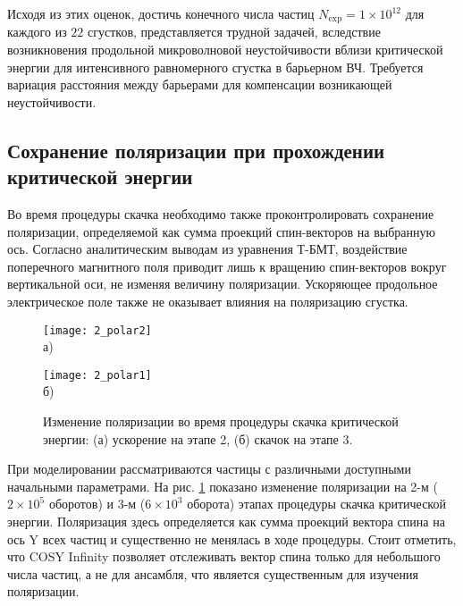 \par Исходя из этих оценок, достичь конечного числа частиц $N_{\textrm{exp}}=1\times10^{12}$ для каждого из $22$ сгустков, представляется трудной задачей, вследствие возникновения продольной микроволновой неустойчивости вблизи критической энергии для интенсивного равномерного сгустка в барьерном ВЧ. Требуется вариация расстояния между барьерами для компенсации возникающей	неустойчивости.

	\subsection{Сохранение поляризации при прохождении критической энергии}\label{subsec:transition_jump/regular/polarization}

\par Во время процедуры скачка необходимо также проконтролировать сохранение поляризации, определяемой как сумма проекций спин-векторов на выбранную ось. Согласно аналитическим выводам из уравнения Т-БМТ, воздействие поперечного магнитного поля приводит лишь к вращению спин-векторов вокруг вертикальной оси, не изменяя величину поляризации. Ускоряющее продольное электрическое поле также не оказывает влияния на поляризацию сгустка.

\begin{figure}[!h]    
    \begin{minipage}[b][][b]{0.49\linewidth}\centering
        \texttt{[image: 2\_polar2]} \\ а)
    \end{minipage}
    \hfill
    \begin{minipage}[b][][b]{0.49\linewidth}\centering
        \texttt{[image: 2\_polar1]} \\ б)
    \end{minipage}
    \caption{Изменение поляризации во время процедуры скачка критической энергии: (а) ускорение на этапе 2, (б) скачок на этапе 3.}
    \label{fig:polar}
\end{figure}

\par При моделировании рассматриваются частицы с различными доступными начальными параметрами. На рис. \ref{fig:polar} показано изменение поляризации на 2-м ($2\times10^5$ оборотов) и 3-м ($6\times10^3$ оборота) этапах процедуры скачка критической энергии. Поляризация здесь определяется как сумма проекций вектора спина на ось Y всех частиц и существенно не менялась в ходе процедуры. Стоит отметить, что COSY Infinity позволяет отслеживать вектор спина только для небольшого числа частиц, а не для ансамбля, что является существенным для изучения поляризации.


